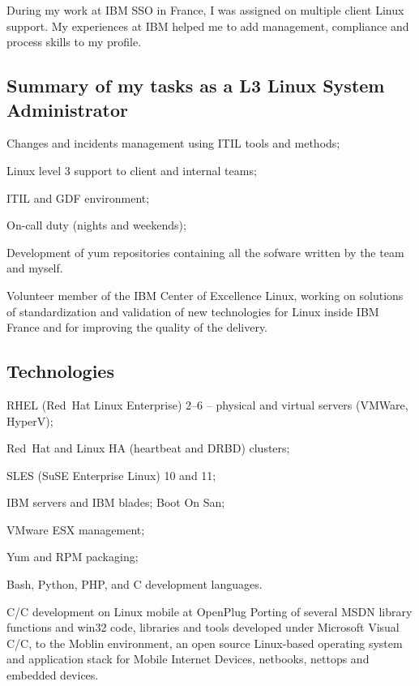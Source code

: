 During my work at IBM SSO in France, I was assigned on multiple client Linux support.
My experiences at IBM helped me to add management, compliance and process skills 
to my profile. 

\subsection{Summary of my tasks as a L3 Linux System Administrator}

\item{\bdot} Changes and incidents management using ITIL tools and methods;
\item{\bdot} Linux level 3 support to client and internal teams;
\item{\bdot} ITIL and GDF environment;
\item{\bdot} On-call duty (nights and weekends);
\item{\bdot} Development of yum repositories containing all the sofware 
   written by the team and myself.

\smallskip\noindent
Volunteer member of the IBM Center of Excellence Linux, working on solutions of 
standardization and validation of new technologies for Linux inside IBM France and
for improving the quality of the delivery.

\subsection{Technologies}

\item{\bdot} RHEL (Red~Hat Linux Enterprise) 2--6 -- physical and virtual 
   servers (VMWare, HyperV);
\item{\bdot} Red~Hat and Linux HA (heartbeat and DRBD) clusters;
\item{\bdot} SLES (SuSE Enterprise Linux) 10 and 11;
\item{\bdot} IBM servers and IBM blades; Boot On San;
\item{\bdot} VMware ESX management;
\item{\bdot} Yum and RPM packaging;
\item{\bdot} Bash, Python, PHP, and C development languages.


\bigskip
{}
   {C/C\plusplus{} development on Linux mobile at OpenPlug}
Porting of several MSDN library functions and win32 code, libraries and tools
developed under Microsoft Visual C/C\plusplus, to the Moblin environment,
an open source Linux-based operating system and application stack for
Mobile Internet Devices, netbooks, nettops and embedded devices.

